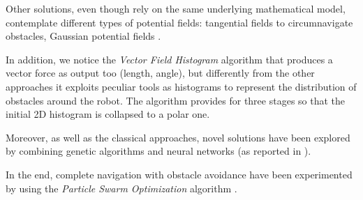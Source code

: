 \noindent
Other solutions, even though rely on the same underlying mathematical model, contemplate different types of potential fields: tangential fields to circumnavigate obstacles, Gaussian potential fields \cite{obstacle-gaussian}.

\noindent
In addition, we notice the \textit{Vector Field Histogram} algorithm that produces a vector force as output too (length, angle), but differently from the other approaches it exploits peculiar tools as histograms to represent the distribution of obstacles around the robot. The algorithm provides for three stages so that the initial 2D histogram is collapsed to a polar one.  

\noindent
Moreover, as well as the classical approaches, novel solutions have been explored by combining genetic algorithms and neural networks (as reported in \cite{obstacle-NN}).

\noindent
In the end, complete navigation with obstacle avoidance have been experimented by using the \textit{Particle Swarm Optimization} algorithm \cite{obstacle-summary-2}.




